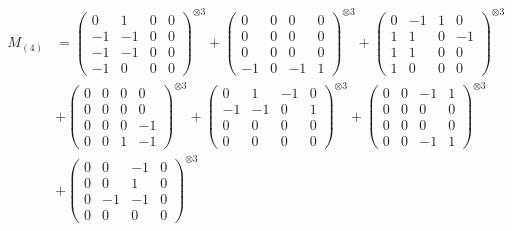 \documentclass{article}
\newcommand{\Mthree}{%
    M_{(4)}
}
\begin{document}
        \newpage
        
        \footnotesize{
        \begin{align}
        \Mthree
        &= \label{Rs16-Rc11-Solution-19-c1} \begin{pmatrix} 0 & 1 & 0 & 0 \\ -1 & -1 & 0 & 0 \\ -1 & -1 & 0 & 0 \\ -1 & 0 & 0 & 0 \end{pmatrix}^{\otimes 3} 
            + \begin{pmatrix} 0 & 0 & 0 & 0 \\ 0 & 0 & 0 & 0 \\ 0 & 0 & 0 & 0 \\ -1 & 0 & -1 & 1 \end{pmatrix}^{\otimes 3} 
            + \begin{pmatrix} 0 & -1 & 1 & 0 \\ 1 & 1 & 0 & -1 \\ 1 & 1 & 0 & 0 \\ 1 & 0 & 0 & 0 \end{pmatrix}^{\otimes 3} \\
        &+ \label{Rs16-Rc11-Solution-19-c4} \begin{pmatrix} 0 & 0 & 0 & 0 \\ 0 & 0 & 0 & 0 \\ 0 & 0 & 0 & -1 \\ 0 & 0 & 1 & -1 \end{pmatrix}^{\otimes 3} 
            + \begin{pmatrix} 0 & 1 & -1 & 0 \\ -1 & -1 & 0 & 1 \\ 0 & 0 & 0 & 0 \\ 0 & 0 & 0 & 0 \end{pmatrix}^{\otimes 3} 
            + \begin{pmatrix} 0 & 0 & -1 & 1 \\ 0 & 0 & 0 & 0 \\ 0 & 0 & 0 & 0 \\ 0 & 0 & -1 & 1 \end{pmatrix}^{\otimes 3} \\
        &+ \label{Rs16-Rc11-Solution-19-c7} \begin{pmatrix} 0 & 0 & -1 & 0 \\ 0 & 0 & 1 & 0 \\ 0 & -1 & -1 & 0 \\ 0 & 0 & 0 & 0 \end{pmatrix}^{\otimes 3} 

\end{align}}
\end{document}
